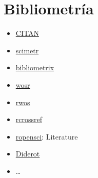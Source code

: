 \documentclass[]{book}
\begin{document}
\hypertarget{bibliom-links}{%
\section{Bibliometría}\label{bibliom-links}}

\begin{itemize}
\item
  \href{https://cran.r-project.org/web/packages/CITAN/index.html}{CITAN}
\item
  \href{https://rubenfcasal.github.io/scimetr/index.html}{scimetr}
\item
  \href{http://www.bibliometrix.org}{bibliometrix}
\item
  \href{https://vt-arc.github.io/wosr/index.html}{wosr}
\item
  \href{https://github.com/juba/rwos}{rwos}
\item
  \href{https://docs.ropensci.org/rcrossref}{rcrossref}
\item
  \href{https://ropensci.org/packages/}{ropensci}: Literature
\item
  \href{https://cran.r-project.org/web/packages/Diderot/index.html}{Diderot}
\item
  \ldots{}
\end{itemize}


\end{document}
